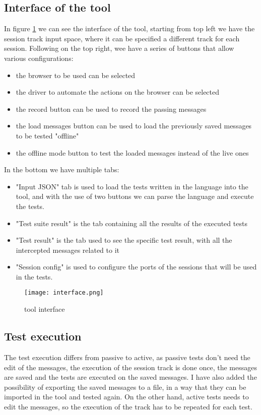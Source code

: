 \subsection{Interface of the tool}
In figure \ref{fig:plugin_interface} we can see the interface of the tool, starting from top left we have the session track input space, where it can be specified a different track for each session. Following on the top right, wee have a series of buttons that allow various configurations:
\begin{itemize}
    \item the browser to be used can be selected
    \item the driver to automate the actions on the browser can be selected
    \item the record button can be used to record the passing messages
    \item the load messages button can be used to load the previously saved messages to be tested "offline"
    \item the offline mode button to test the loaded messages instead of the live ones
\end{itemize}

In the bottom we have multiple tabs:
\begin{itemize}
    \item "Input JSON" tab is used to load the tests written in the language into the tool, and with the use of two buttons we can parse the language and execute the tests.
    \item "Test suite result" is the tab containing all the results of the executed tests
    \item "Test result" is the tab used to see the specific test result, with all the intercepted messages related to it
    \item "Session config" is used to configure the ports of the sessions that will be used in the tests.
\end{itemize}

\begin{figure}
    \texttt{[image: interface.png]}
    \caption{tool interface}
    \label{fig:plugin_interface}
\end{figure}

\subsection{Test execution}
The test execution differs from passive to active, as passive tests don't need the edit of the messages, the execution of the \gls{session track} is done once, the messages are saved and the tests are executed on the saved messages. I have also added the possibility of exporting the saved messages to a file, in a way that they can be imported in the tool and tested again.
On the other hand, active tests needs to edit the messages, so the execution of the track has to be repeated for each test.

